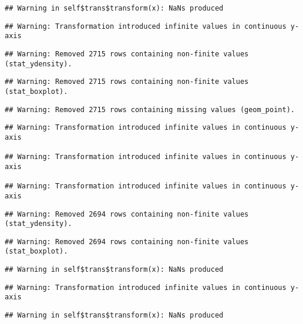 \documentclass[a4paper,nobind]{templates/ociamthesis}
\begin{document}
\begin{verbatim}
## Warning in self$trans$transform(x): NaNs produced
\end{verbatim}

\begin{verbatim}
## Warning: Transformation introduced infinite values in continuous y-axis
\end{verbatim}

\begin{verbatim}
## Warning: Removed 2715 rows containing non-finite values (stat_ydensity).
\end{verbatim}

\begin{verbatim}
## Warning: Removed 2715 rows containing non-finite values (stat_boxplot).
\end{verbatim}

\begin{verbatim}
## Warning: Removed 2715 rows containing missing values (geom_point).
\end{verbatim}

\begin{verbatim}
## Warning: Transformation introduced infinite values in continuous y-axis

## Warning: Transformation introduced infinite values in continuous y-axis

## Warning: Transformation introduced infinite values in continuous y-axis
\end{verbatim}

\begin{verbatim}
## Warning: Removed 2694 rows containing non-finite values (stat_ydensity).
\end{verbatim}

\begin{verbatim}
## Warning: Removed 2694 rows containing non-finite values (stat_boxplot).
\end{verbatim}

\begin{verbatim}
## Warning in self$trans$transform(x): NaNs produced
\end{verbatim}

\begin{verbatim}
## Warning: Transformation introduced infinite values in continuous y-axis
\end{verbatim}

\begin{verbatim}
## Warning in self$trans$transform(x): NaNs produced
\end{verbatim}
\end{document}
